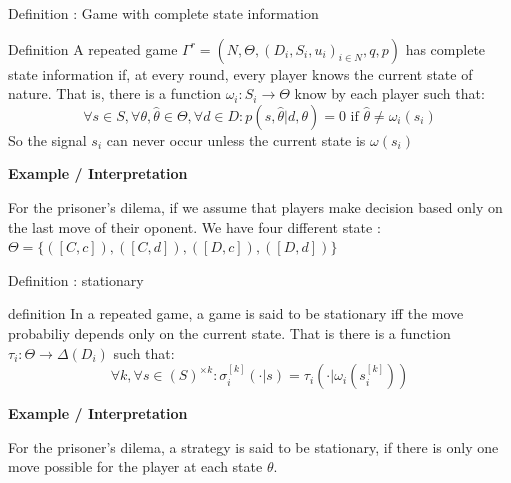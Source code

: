 \begin{frame}{Definition : Game with complete state information}

\begin{block}{Definition}
A repeated game $\Gamma^r = (N,\Theta, (D_i,S_i,u_i)_{i\in N},q,p)$ has {\color{green}complete state information} if, at every round, every player knows the current state of nature. That is, there is a function $\omega_i:S_i \rightarrow \Theta$ know by each player such that:
\begin{equation*}
    \forall s \in S, \forall \theta, \hat{\theta} \in \Theta, \forall d \in D : p(s,\hat{\theta} | d,\theta) = 0 \text{ if } \hat{\theta} \neq \omega_i(s_i)
\end{equation*}
So the signal $s_i$ can never occur unless the current state is $\omega(s_i)$
\end{block}

\pause
\textbf{Example / Interpretation}

For the prisoner's dilema, if we assume that \alert{players make decision based only on the last move of their oponent}. We have four different state : $\Theta = \{([C,c]), ([C,d]), ([D,c]), ([D,d])\}$

\end{frame}

\begin{frame}{Definition : stationary}

\begin{block}{definition}
In a repeated game, a game is said to be {\color{green}stationary} iff the move probabiliy depends only on the current state. That is there is a function $\tau_i : \Theta \rightarrow \Delta(D_i)$ such that:
\begin{equation*}
	\forall k, \forall s \in (S)^{\times k} : \sigma_i^{[k]}(\cdot | s) = \tau_i(\cdot | \omega_i(s_i^{[k]}))
\end{equation*}
\end{block}

\pause
\textbf{Example / Interpretation}

For the prisoner's dilema, a strategy is said to be stationary, if there is only one move possible for the player at each state $\theta$.

\end{frame}

